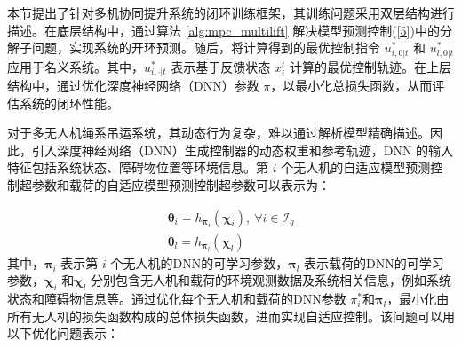 

本节提出了针对多机协同提升系统的闭环训练框架，其训练问题采用双层结构进行描述。在底层结构中，通过算法 \ref{alg:mpc_multilift} 解决模型预测控制(\ref{5})中的分解子问题，实现系统的开环预测。随后，将计算得到的最优控制指令 \( u^*_{i,0|t} \) 和 \( u^*_{l,0|t} \) 应用于名义系统。其中，\( u^*_{i,\cdot|t} \) 表示基于反馈状态 \( x_i^t \) 计算的最优控制轨迹。在上层结构中，通过优化深度神经网络（DNN）参数 \( \pi \)，以最小化总损失函数，从而评估系统的闭环性能。

对于多无人机绳系吊运系统，其动态行为复杂，难以通过解析模型精确描述。因此，引入深度神经网络（DNN）生成控制器的动态权重和参考轨迹，DNN 的输入特征包括系统状态、障碍物位置等环境信息。第 \(i\) 个无人机的自适应模型预测控制超参数和载荷的自适应模型预测控制超参数可以表示为：

\begin{equation}
	\label{4}
	\begin{gathered}
		\boldsymbol{\theta}_i=h_{\boldsymbol{\pi}_i}\left(\boldsymbol{\chi}_i\right),\mathrm{~}\forall i\in\mathcal{I}_q\\    
		\boldsymbol{\theta}_l=h_{\boldsymbol{\pi}_l}\left(\boldsymbol{\chi}_l\right)
	\end{gathered}
\end{equation}
其中，\( \bm \pi_i \) 表示第 \(i\) 个无人机的DNN的可学习参数，\( \bm \pi_l \) 表示载荷的DNN的可学习参数，\( \bm \chi_i \) 和\( \bm \chi_l \) 分别包含无人机和载荷的环境观测数据及系统相关信息，例如系统状态和障碍物信息等。通过优化每个无人机和载荷的DNN参数 \( \pi_i^* \)和\(\bm \pi_l\)，最小化由所有无人机的损失函数构成的总体损失函数，进而实现自适应控制。该问题可以用以下优化问题表示：

